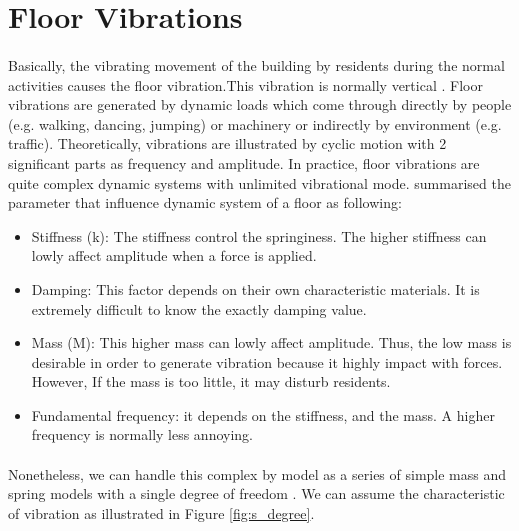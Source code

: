 \section{Floor Vibrations}
\paragraph{}
Basically, the vibrating movement of the building by residents during the normal activities causes the floor vibration.This vibration is normally vertical \cite{steelconstruction_2016}. Floor vibrations are generated by dynamic loads which come through directly by people (e.g. walking, dancing, jumping) or machinery or  indirectly by environment (e.g. traffic). Theoretically, vibrations are illustrated by cyclic motion with 2 significant parts as frequency and amplitude. In practice, floor vibrations are quite complex dynamic systems with unlimited vibrational mode. \citeauthor{ljunggren2006floor} \citeyear{ljunggren2006floor} summarised the parameter that influence dynamic system of a floor as following:
\begin{itemize}
\item Stiffness (k): The stiffness control the springiness.  The higher stiffness can lowly affect amplitude when a force is applied.
\item Damping: This factor depends on their own characteristic materials. It is extremely difficult to know the exactly damping value.
\item Mass (M): This higher mass can lowly affect amplitude. Thus, the low mass is desirable  in order to generate vibration because it highly impact with forces. However,  If the mass is  too little, it may disturb residents.
\item Fundamental frequency: it depends on the stiffness, and the mass. A higher frequency is normally less annoying.\paragraph{}
\end{itemize}
\paragraph{}
Nonetheless, we can handle this complex by model as a series of simple mass and spring models with a single degree of freedom \cite{p_spring_2015}. We can assume the characteristic of vibration  as illustrated in Figure \ref{fig:s_degree}.


